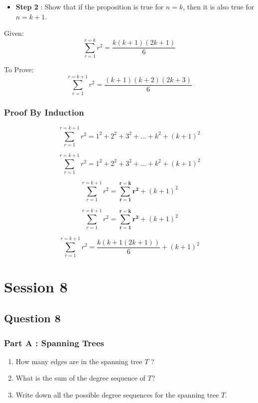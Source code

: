 \documentclass[]{report}
\begin{document}
\begin{itemize}
	\item \textbf{Step 2} : Show that if the proposition is true for $n=k$, then it is also true for $n=k+1$.
\end{itemize}
Given: \[ \sum_{r=1}^{r=k} r^2 = \frac{k(k+1)(2k+1)}{6} \]

To Prove: \[ \sum_{r=1}^{r=k+1} r^2 = \frac{(k+1)(k+2)(2k+3)}{6} \]



\subsection{Proof By Induction}



\[ \sum_{r=1}^{r=k+1} r^2 = 1^2 + 2^2 + 3^2 + \ldots + k^2 + (k+1)^2 \]






\[ \sum_{r=1}^{r=k+1} r^2 = 1^2 + 2^2 + 3^2 + \ldots + k^2 + (k+1)^2 \]

\[ \sum_{r=1}^{r=k+1} r^2 = \boldsymbol{\sum_{r=1}^{r=k} r^2} + (k+1)^2 \]



\[ \sum_{r=1}^{r=k+1} r^2 = \boldsymbol{\sum_{r=1}^{r=k} r^2} + (k+1)^2 \]

\[ \sum_{r=1}^{r=k+1} r^2 = \frac{k(k+1(2k+1
	))}{6} + (k+1)^2 \]


\chapter{Session 8}
\section*{Question 8}
\subsection*{Part A : Spanning Trees}
\begin{enumerate}
\item How many edges are in the spanning tree $T$ ?
\item What is the sum of the degree sequence of $T$?
\item Write down all the possible degree sequences for the spanning tree $T$.
\end{enumerate}
\end{document}
